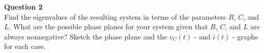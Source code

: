 \documentclass[preview]{standalone}
\begin{document}
\begin{center}
\textbf{Question 2} \\[10pt]
                    Find the eigenvalues of the resulting system in terms of the parameters $R$, $C$, and \\
                    $L$. What are the possible phase planes for your system given that $R$, $C$, and $L$ are \\
                    always nonnegative? Sketch the phase plane and the $v_C(t)$ - and $i(t)$ - graphs for each case. \\
\end{center}
\end{document}
